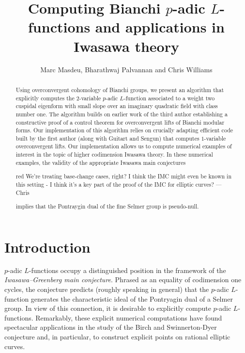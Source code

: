 \documentclass[a4paper,11pt]{article}
\title{Computing Bianchi $p$-adic $L$-functions and applications in Iwasawa theory}
\author{Marc Masdeu, Bharathwaj Palvannan and Chris Williams}
\date{}
\newcommand{\CWnote}[1]{
 \begin{color}{red}
 \marginpar{$\spadesuit$} #1
  --- Chris
 \end{color}
}
\newcommand{\CWnote}[1]{

}
\numberwithin{equation}{section}
\begin{document}
%
%

\maketitle
\setcounter{tocdepth}{2}

\begin{abstract}
\begin{comment}
Let $\f$ be a cuspidal eigenform of weight 2 over an imaginary quadratic field $K$. In this paper, we use the overconvergent cohomology of Bianchi groups to explicitly compute $p$-adic $L$-functions attached to $\f$. We give several applications to Iwasawa theory: in particular, we provide new examples where Coates and Sujatha's psuedo-nullity conjecture holds for rational elliptic curves.  --- including the first examples in rank 1.
\end{comment}
Using overconvergent cohomology of Bianchi groups, we present an algorithm that explicitly computes the $2$-variable $p$-adic $L$-function associated to a weight two cuspidal eigenform with small slope over an imaginary quadratic field with class number one. The algorithm builds on earlier work of the third author establishing a constructive proof of a control theorem for overconvergent lifts of Bianchi modular forms. Our implementation of this algorithm relies on crucially adapting efficient code built by the first author (along with Guitart and Sengun) that computes $1$-variable overconvergent lifts. Our implementation allows us to compute numerical examples of interest in the topic of higher codimension Iwasawa theory. In these numerical examples, the validity of the appropriate Iwasawa main conjectures \CWnote{We're treating base-change cases, right? I think the IMC might even be known in this setting - I think it's a key part of the proof of the IMC for elliptic curves?} implies that the Pontraygin dual of the fine Selmer group is pseudo-null.
\end{abstract}

\tableofcontents

\section{Introduction}

$p$-adic $L$-functions occupy a distinguished position in the framework of the \textit{Iwasawa--Greenberg main conjecture}. Phrased as an equality of codimension one cycles, the conjecture predicts (roughly speaking in general) that the $p$-adic $L$-function generates the characteristic ideal of the Pontryagin dual of a Selmer group. In view of this connection, it is desirable to explicitly compute $p$-adic $L$-functions.  Remarkably, these explicit numerical computations have found spectacular applications in the study of the Birch and Swinnerton-Dyer conjecture and, in particular, to construct explicit points on rational elliptic curves.
\end{document}
